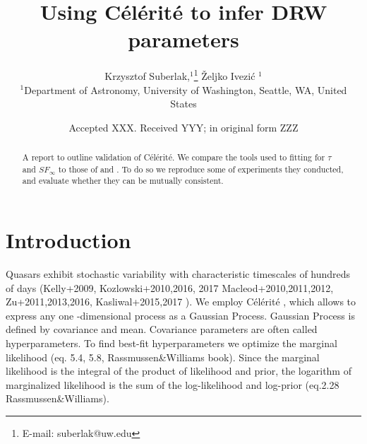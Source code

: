 \documentclass[fleqn,usenatbib]{mnras}  %
\title[DRW fitting]{Using C\'el\'erit\'e to infer DRW parameters }
\author[K. Suberlak et al.]{
Krzysztof Suberlak,$^{1}$\thanks{E-mail: suberlak@uw.edu}
\v{Z}eljko Ivezi\'c $^{1}$
\\
$^{1}$Department of Astronomy, University of Washington, Seattle, WA, United States\\
}
\date{Accepted XXX. Received YYY; in original form ZZZ}
\begin{document}
\label{firstpage}
\pagerange{\pageref{firstpage}--\pageref{lastpage}}
\maketitle

\begin{abstract}
A report to outline validation of C\'el\'erit\'e. We compare the tools used to fitting for $\tau$ and $SF_{\infty}$ to those of \cite{kozlowski2017a}and \cite{macleod2011}. To do so we reproduce some of experiments they conducted, and evaluate whether they can be mutually consistent. 
\end{abstract}




\section{Introduction}
\label{sec:1}

Quasars exhibit stochastic variability with characteristic timescales of hundreds of days (Kelly+2009,  Kozlowski+2010,2016, 2017 Macleod+2010,2011,2012, Zu+2011,2013,2016, Kasliwal+2015,2017 ). We employ  C\'el\'erit\'e \citep{foreman2017} , which allows to express any one -dimensional process as a Gaussian Process.  Gaussian Process is defined by covariance and mean. Covariance parameters are often called hyperparameters. To find best-fit hyperparameters we optimize the marginal likelihood  (eq. 5.4, 5.8, Rassmussen\&Williams book). Since the marginal likelihood is the integral of  the product of likelihood and prior,  the logarithm of marginalized likelihood is the sum of the log-likelihood and log-prior (eq.2.28 Rassmussen\&Williams). 
\end{document}
